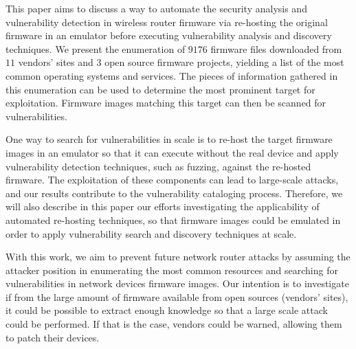 This paper aims to discuss a way to automate the security analysis and vulnerability detection in wireless router firmware via re-hosting the original firmware in an emulator before executing vulnerability analysis and discovery techniques. We present the enumeration of $9176$ firmware files downloaded from $11$ vendors' sites and $3$ open source firmware projects, yielding a list of the most common operating systems and services. The pieces of information gathered in this enumeration can be used to determine the most prominent target for exploitation. Firmware images matching this target can then be scanned for vulnerabilities. 

One way to search for vulnerabilities in scale is to re-host the target firmware images in an emulator so that it can execute without the real device and apply vulnerability detection techniques, such as fuzzing, against the re-hosted firmware. The exploitation of these components can lead to large-scale attacks, and our results contribute to the vulnerability cataloging process. Therefore, we will also describe in this paper our efforts investigating the applicability of automated re-hosting techniques, so that firmware images could be emulated in order to apply vulnerability search and discovery techniques at scale.

With this work, we aim to prevent future network router attacks by assuming the attacker position in enumerating the most common resources and searching for vulnerabilities in network devices firmware images. Our intention is to investigate if from the large amount of firmware available from open sources (vendors' sites), it could be possible to extract enough knowledge so that a large scale attack could be performed. If that is the case, vendors could be warned, allowing them to patch their devices.



